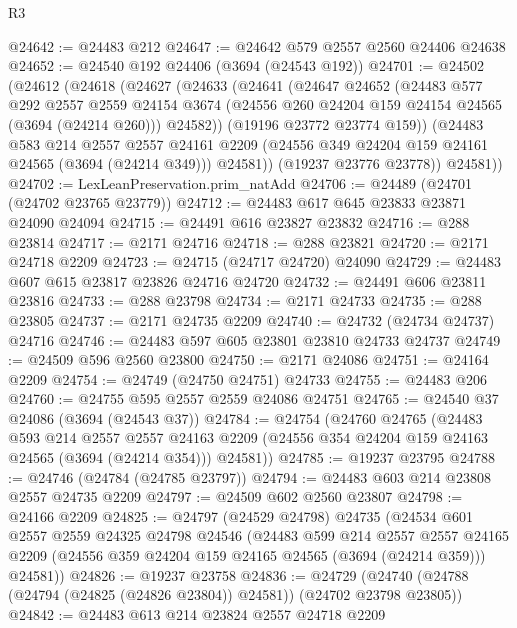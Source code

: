 \begin{lexlean}{R3}
\begin{coremodule}
@24642 := @24483 @212
@24647 := @24642 @579 @2557 @2560 @24406 @24638
@24652 := @24540 @192 @24406 (@3694 (@24543 @192))
@24701 := @24502
    (@24612
      (@24618
        (@24627
          (@24633
            (@24641
              (@24647
                @24652
                (@24483
                  @577
                  @292
                  @2557
                  @2559
                  @24154
                  @3674
                  (@24556 @260 @24204 @159 @24154 @24565 (@3694 (@24214 @260)))
                  @24582))
              (@19196 @23772 @23774 @159))
            (@24483
              @583
              @214
              @2557
              @2557
              @24161
              @2209
              (@24556 @349 @24204 @159 @24161 @24565 (@3694 (@24214 @349)))
              @24581))
          (@19237 @23776 @23778))
        @24581))
@24702 := LexLeanPreservation.prim_natAdd
@24706 := @24489 (@24701 (@24702 @23765 @23779))
@24712 := @24483 @617 @645 @23833 @23871 @24090 @24094
@24715 := @24491 @616 @23827 @23832
@24716 := @288 @23814
@24717 := @2171 @24716
@24718 := @288 @23821
@24720 := @2171 @24718 @2209
@24723 := @24715 (@24717 @24720) @24090
@24729 := @24483 @607 @615 @23817 @23826 @24716 @24720
@24732 := @24491 @606 @23811 @23816
@24733 := @288 @23798
@24734 := @2171 @24733
@24735 := @288 @23805
@24737 := @2171 @24735 @2209
@24740 := @24732 (@24734 @24737) @24716
@24746 := @24483 @597 @605 @23801 @23810 @24733 @24737
@24749 := @24509 @596 @2560 @23800
@24750 := @2171 @24086
@24751 := @24164 @2209
@24754 := @24749 (@24750 @24751) @24733
@24755 := @24483 @206
@24760 := @24755 @595 @2557 @2559 @24086 @24751
@24765 := @24540 @37 @24086 (@3694 (@24543 @37))
@24784 := @24754
    (@24760
      @24765
      (@24483
        @593
        @214
        @2557
        @2557
        @24163
        @2209
        (@24556 @354 @24204 @159 @24163 @24565 (@3694 (@24214 @354)))
        @24581))
@24785 := @19237 @23795
@24788 := @24746 (@24784 (@24785 @23797))
@24794 := @24483 @603 @214 @23808 @2557 @24735 @2209
@24797 := @24509 @602 @2560 @23807
@24798 := @24166 @2209
@24825 := @24797
    (@24529 @24798)
    @24735
    (@24534
      @601
      @2557
      @2559
      @24325
      @24798
      @24546
      (@24483
        @599
        @214
        @2557
        @2557
        @24165
        @2209
        (@24556 @359 @24204 @159 @24165 @24565 (@3694 (@24214 @359)))
        @24581))
@24826 := @19237 @23758
@24836 := @24729 (@24740 (@24788 (@24794 (@24825 (@24826 @23804)) @24581)) (@24702 @23798 @23805))
@24842 := @24483 @613 @214 @23824 @2557 @24718 @2209

\end{coremodule}
\end{lexlean}
